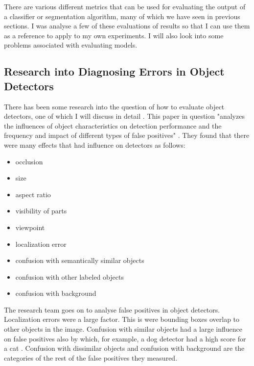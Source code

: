 There are various different metrics that can be used for evaluating the output
of a classifier or segmentation algorithm, many of which we have seen in previous
sections. I was analyse a few of these evaluations of results so that I can use
them as a reference to apply to my own experiments. I will also look into some
problems associated with evaluating models.

\subsection{Research into Diagnosing Errors in Object Detectors}
There has been some research into the question of how to evaluate object
detectors, one of which I will discuss in detail \textcite{diagnosingErrors}.
This paper in question "analyzes the influences of object characteristics on
detection performance and the frequency and impact of different types of false
positives" \textcite{diagnosingErrors}. They found that there were many effects
that had influence on detectors as follows:
\begin{itemize}
    \item{occlusion}
    \item{size}
    \item{aspect ratio}
    \item{visibility of parts}
    \item{viewpoint}
    \item{localization error}
    \item{confusion with semantically similar objects}
    \item{confusion with other labeled objects}
    \item{confusion with background}
\end{itemize}

The research team goes on to analyse false positives in object detectors.
Localization errors were a large factor. This is were bounding boxes overlap to
other objects in the image. Confusion with similar objects had a large influence
on false positives also by which, for example, a dog detector had a high score
for a cat \textcite{diagnosingErrors}. Confusion with dissimilar objects and
confusion with background are the categories of the rest of the false positives
they measured.


